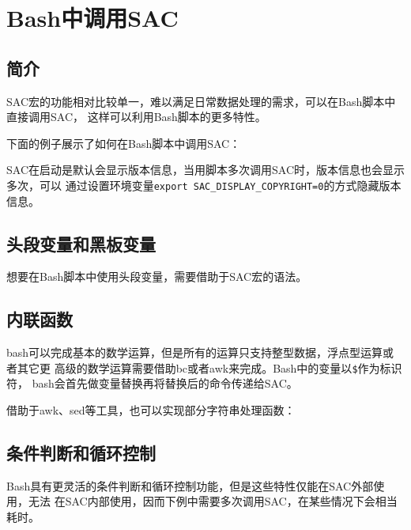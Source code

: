 \section{Bash中调用SAC}
\label{sec:sac-bash}

\subsection{简介}
SAC宏的功能相对比较单一，难以满足日常数据处理的需求，可以在Bash脚本中直接调用SAC，
这样可以利用Bash脚本的更多特性。

下面的例子展示了如何在Bash脚本中调用SAC：


SAC在启动是默认会显示版本信息，当用脚本多次调用SAC时，版本信息也会显示多次，可以
通过设置环境变量\lstinline{export SAC_DISPLAY_COPYRIGHT=0}的方式隐藏版本信息。

\subsection{头段变量和黑板变量}
想要在Bash脚本中使用头段变量，需要借助于SAC宏的语法。


\subsection{内联函数}
bash可以完成基本的数学运算，但是所有的运算只支持整型数据，浮点型运算或者其它更
高级的数学运算需要借助bc或者awk来完成。Bash中的变量以\lstinline{$}作为标识符，
bash会首先做变量替换再将替换后的命令传递给SAC。


借助于awk、sed等工具，也可以实现部分字符串处理函数：


\subsection{条件判断和循环控制}
Bash具有更灵活的条件判断和循环控制功能，但是这些特性仅能在SAC外部使用，无法
在SAC内部使用，因而下例中需要多次调用SAC，在某些情况下会相当耗时。

